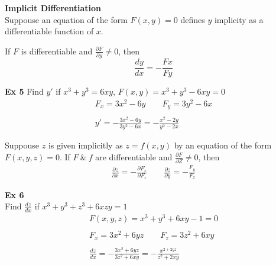 \documentclass{article}
\begin{document}
    \textbf{Implicit Differentiation}\\
    Suppouse an equation of the form $ F(x,y)=0 $ defines $ y $ implicity as a differentiable function of $ x $.

    If $ F $ is differentiable and $ \frac{\partial F}{\partial y} \neq 0 $, then
    \[
        \frac{dy}{dx}=-\frac{Fx}{Fy} 
    \]

    \textbf{Ex 5}
    Find $ y'$ if $ x^{3}+y^{3}=6xy$, $ F(x,y)=x^{3}+y^{3}-6xy=0 $
    \[
        \begin{gathered}
          F_{x}=3x^{2}-6y \qquad F_{y}=3y^{2}-6x\\
          ~\\
          y'=-\frac{3x^{2}-6y}{3y^{2}-6x}=\boxed{- \frac{x^{2}-2y }{y^{2}-2x }}  
        \end{gathered}
    \]

    Suppouse $ z $ is given implicitly as $ z=f(x,y)$ by an equation of the form $ F(x,y,z)=0 $. If $ F ~\&~ f $ are differentiable and $ \frac{\partial F}{\partial Z}\neq 0 $, then
    \[
        \begin{gathered}
        \frac{\partial z}{\partial x}= -\frac{\partial F_{x} }{\partial F_{z} } \qquad \frac{\partial z}{\partial y}=-\frac{F_{y} }{F_{z}} 
        \end{gathered}
    \]

    \textbf{Ex 6}\\
    Find $ \frac{dz}{dx}  $ if $ x^{3}+y^{3}+z^{3}+6xzy=1   $
    \[
        \begin{gathered}
        F(x,y,z)=x^{3}+y^{3}+6xy-1=0\\
        ~\\
        F_{x}=3x^{2}+6yz \qquad F_{z}=3z^{2}+6xy\\
        ~\\
        \frac{dz}{dx}=- \frac{3x^{2}+6yz}{3z^{2}+6xy} = \boxed{- \frac{x^{2+2yz} }{z^{2}+2xy}} 
        \end{gathered}
    \]
\end{document}
